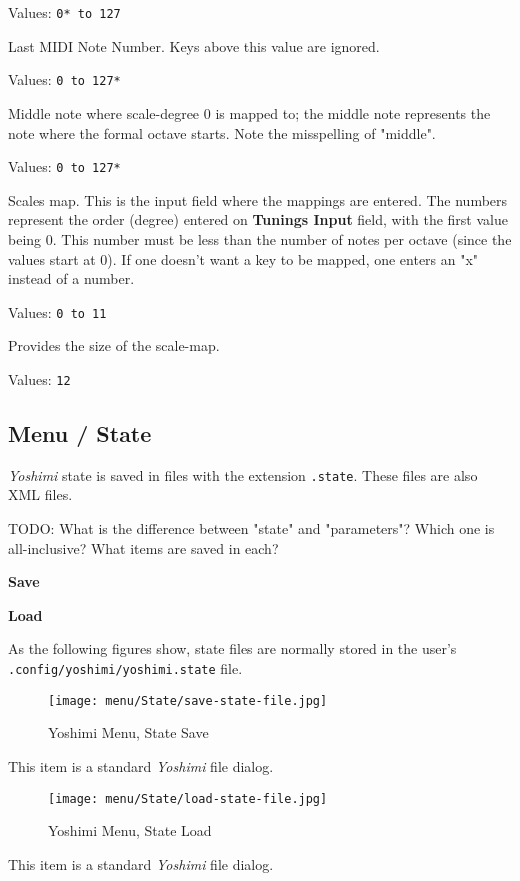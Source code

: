    Values: \texttt{0* to 127}

   Last MIDI Note Number.
   Keys above this value are ignored.

   Values: \texttt{0 to 127*}

   Middle note where scale-degree 0 is mapped to;
   the middle note represents the note where the formal octave starts.
   Note the misspelling of "middle".

   Values: \texttt{0 to 127*}

   Scales map.  This is the input field where the mappings are entered.
   The numbers represent the order (degree) entered on
   \textbf{Tunings Input} field, with the first value being 0.
   This number must be less than the number of notes per octave (since
   the values start at 0).
   If one doesn't want a key to be mapped, one enters an "x" instead of a
   number.

   Values: \texttt{0 to 11}

   Provides the size of the scale-map.

   Values: \texttt{12}

\subsection{Menu / State}
\label{subsec:menu_state}

   \textsl{Yoshimi} state is saved in files with the extension
   \texttt{.state}.  These files are also XML files.

   TODO: What is the difference between "state" and "parameters"?
   Which one is all-inclusive?  What items are saved in each?

   \begin{enumber}
      \item \textbf{Save}
      \item \textbf{Load}
   \end{enumber}

   As the following figures show, state files are normally stored in the
   user's \texttt{.config/yoshimi/yoshimi.state} file.

\begin{figure}[H]
   \centering 
   \texttt{[image: menu/State/save-state-file.jpg]}
   \caption{Yoshimi Menu, State Save}
   \label{fig:yoshimi_menu_state_save}
\end{figure}

   This item is a standard \textsl{Yoshimi} file dialog.

\begin{figure}[H]
   \centering 
   \texttt{[image: menu/State/load-state-file.jpg]}
   \caption{Yoshimi Menu, State Load}
   \label{fig:yoshimi_menu_state_load}
\end{figure}

   This item is a standard \textsl{Yoshimi} file dialog.

